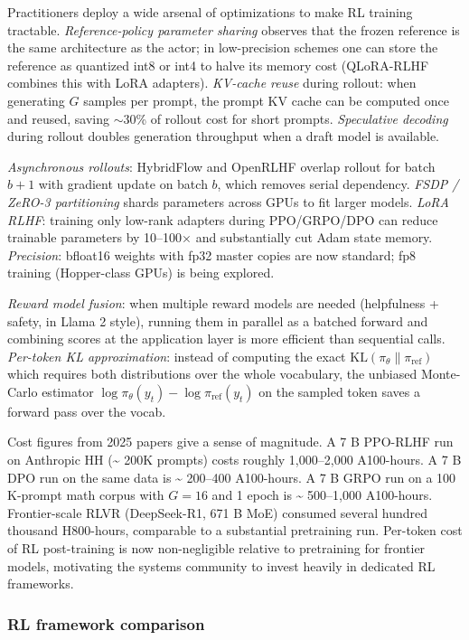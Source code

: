 \documentclass{article}
\begin{document}
Practitioners deploy a wide arsenal of optimizations to make RL training tractable. \emph{Reference-policy parameter sharing} observes that the frozen reference is the same architecture as the actor; in low-precision schemes one can store the reference as quantized int8 or int4 to halve its memory cost (QLoRA-RLHF combines this with LoRA adapters). \emph{KV-cache reuse} during rollout: when generating \(G\) samples per prompt, the prompt KV cache can be computed once and reused, saving \(\sim 30\)\% of rollout cost for short prompts. \emph{Speculative decoding} during rollout doubles generation throughput when a draft model is available.

\emph{Asynchronous rollouts}: HybridFlow and OpenRLHF overlap rollout for batch \(b+1\) with gradient update on batch \(b\), which removes serial dependency. \emph{FSDP / ZeRO-3 partitioning} shards parameters across GPUs to fit larger models. \emph{LoRA RLHF}: training only low-rank adapters during PPO/GRPO/DPO can reduce trainable parameters by 10--100× and substantially cut Adam state memory. \emph{Precision}: bfloat16 weights with fp32 master copies are now standard; fp8 training (Hopper-class GPUs) is being explored.

\emph{Reward model fusion}: when multiple reward models are needed (helpfulness + safety, in Llama 2 style), running them in parallel as a batched forward and combining scores at the application layer is more efficient than sequential calls. \emph{Per-token KL approximation}: instead of computing the exact \(\mathrm{KL}(\pi_\theta \| \pi_{\text{ref}})\) which requires both distributions over the whole vocabulary, the unbiased Monte-Carlo estimator \(\log \pi_\theta(y_t) - \log \pi_{\text{ref}}(y_t)\) on the sampled token saves a forward pass over the vocab.

Cost figures from 2025 papers give a sense of magnitude. A 7 B PPO-RLHF run on Anthropic HH (\textasciitilde{} 200K prompts) costs roughly 1,000--2,000 A100-hours. A 7 B DPO run on the same data is \textasciitilde{} 200--400 A100-hours. A 7 B GRPO run on a 100 K-prompt math corpus with \(G = 16\) and 1 epoch is \textasciitilde{} 500--1,000 A100-hours. Frontier-scale RLVR (DeepSeek-R1, 671 B MoE) consumed several hundred thousand H800-hours, comparable to a substantial pretraining run. Per-token cost of RL post-training is now non-negligible relative to pretraining for frontier models, motivating the systems community to invest heavily in dedicated RL frameworks.

\subsubsection{RL framework comparison}\label{rl-framework-comparison}
\end{document}
